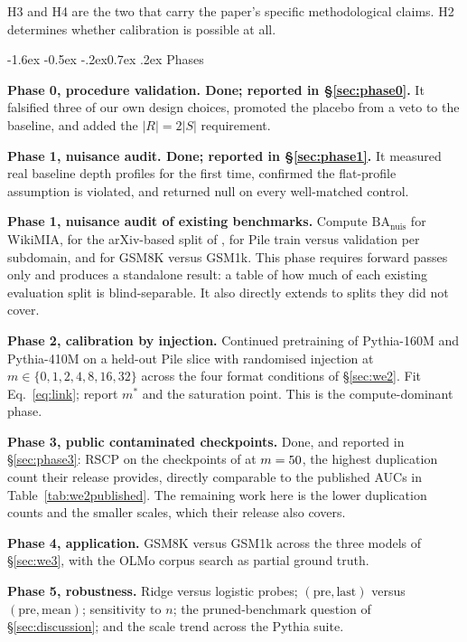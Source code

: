 \documentclass[10pt,twocolumn,letterpaper]{article}
\makeatletter
\renewcommand\subsection{\@startsection{subsection}{2}{\z@}%
  {-1.6ex \@plus -0.5ex \@minus -.2ex}{0.7ex \@plus .2ex}%
  {\normalfont\normalsize\bfseries}}
\newcommand{\BA}{\mathrm{BA}}
\newcommand{\nuis}{\mathrm{nuis}}
\makeatother
\begin{document}
H3 and H4 are the two that carry the paper's specific methodological claims. H2 determines whether calibration is possible at all.

\subsection{Phases}

\textbf{Phase 0, procedure validation. Done; reported in \S\ref{sec:phase0}.} It falsified three of our own design choices, promoted the placebo from a veto to the baseline, and added the $|R| = 2|S|$ requirement.

\textbf{Phase 1, nuisance audit. Done; reported in \S\ref{sec:phase1}.} It measured real baseline depth profiles for the first time, confirmed the flat-profile assumption is violated, and returned null on every well-matched control.

\textbf{Phase 1, nuisance audit of existing benchmarks.} Compute $\BA_{\nuis}$ for WikiMIA, for the arXiv-based split of \citet{liu2024probing}, for Pile train versus validation per subdomain, and for GSM8K versus GSM1k. This phase requires forward passes only and produces a standalone result: a table of how much of each existing evaluation split is blind-separable. It also directly extends \citet{das2024blind} to splits they did not cover.

\textbf{Phase 2, calibration by injection.} Continued pretraining of Pythia-160M and Pythia-410M on a held-out Pile slice with randomised injection at $m\in\{0,1,2,4,8,16,32\}$ across the four format conditions of \S\ref{sec:we2}. Fit Eq.~\eqref{eq:link}; report $m^{*}$ and the saturation point. This is the compute-dominant phase.

\textbf{Phase 3, public contaminated checkpoints.} Done, and reported in \S\ref{sec:phase3}: RSCP on the checkpoints of \citet{oren2024proving} at $m=50{}$, the highest duplication count their release provides, directly comparable to the published AUCs in Table~\ref{tab:we2published}. The remaining work here is the lower duplication counts and the smaller scales, which their release also covers.

\textbf{Phase 4, application.} GSM8K versus GSM1k across the three models of \S\ref{sec:we3}, with the OLMo corpus search as partial ground truth.

\textbf{Phase 5, robustness.} Ridge versus logistic probes; $(\mathrm{pre},\mathrm{last})$ versus $(\mathrm{pre},\mathrm{mean})$; sensitivity to $n$; the pruned-benchmark question of \S\ref{sec:discussion}; and the scale trend across the Pythia suite.
\end{document}
